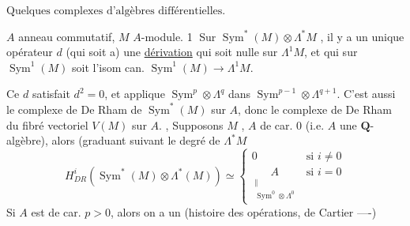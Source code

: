 $\boxed{\text{Quelques complexes d'algèbres différentielles.}}$

$A$ anneau commutatif, $M$ $A$-module.
\textcircled{1} Sur $\operatorname{Sym}^*(M)\otimes\Lambda^*M$ , il y a un unique opérateur $d$ (qui soit  a) une \uline{dérivation}    qui soit nulle sur $\Lambda^1M$, et qui sur $\operatorname{Sym}^1(M)$ soit l'isom can. $\operatorname{Sym}^1(M)\longrightarrow\Lambda^1M$.

Ce $d$  satisfait $d^2=0$, et applique $\operatorname{Sym}^p\otimes\Lambda^q$ dans $\operatorname{Sym}^{p-1}\otimes\Lambda^{q+1}$.   C'est aussi le complexe de De Rham de $\operatorname{Sym}^*(M)$ sur $A$, donc le complexe de De Rham du fibré vectoriel $V(M)$ sur $A$. ,
Supposons $M$ ,  $A$ de car. $0$ (i.e. $A$ une $\mathbf Q$-algèbre), alors
(graduant suivant le degré de $\Lambda^*M$
\[
H^i_{DR}(\operatorname{Sym}^*(M)\otimes\Lambda^*(M))\simeq
\begin{cases}0&\text{si }i\neq0\\
\underset{\substack{\Vert\\\operatorname{Sym}^0\otimes\Lambda^0}}{A}&\text{si }i=0
\end{cases}
\]
Si $A$ est de car. $p>0$,  alors on a un (histoire des opérations, de Cartier ----)

